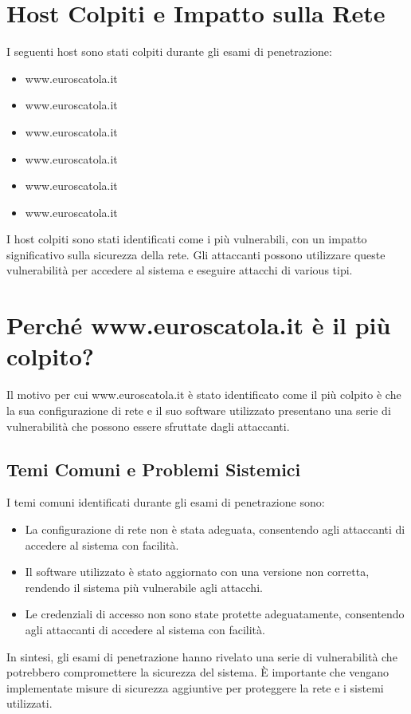 \section{Host Colpiti e Impatto sulla Rete}

I seguenti host sono stati colpiti durante gli esami di penetrazione:
\begin{itemize}
\item www.euroscatola.it
\item www.euroscatola.it
\item www.euroscatola.it
\item www.euroscatola.it
\item www.euroscatola.it
\item www.euroscatola.it
\end{itemize}
I host colpiti sono stati identificati come i più vulnerabili, con un impatto significativo sulla sicurezza della rete. Gli attaccanti possono utilizzare queste vulnerabilità per accedere al sistema e eseguire attacchi di various tipi.

\section{Perché www.euroscatola.it è il più colpito?}

Il motivo per cui www.euroscatola.it è stato identificato come il più colpito è che la sua configurazione di rete e il suo software utilizzato presentano una serie di vulnerabilità che possono essere sfruttate dagli attaccanti.

\subsection{Temi Comuni e Problemi Sistemici}

I temi comuni identificati durante gli esami di penetrazione sono:
\begin{itemize}
\item La configurazione di rete non è stata adeguata, consentendo agli attaccanti di accedere al sistema con facilità.
\item Il software utilizzato è stato aggiornato con una versione non corretta, rendendo il sistema più vulnerabile agli attacchi.
\item Le credenziali di accesso non sono state protette adeguatamente, consentendo agli attaccanti di accedere al sistema con facilità.
\end{itemize}
In sintesi, gli esami di penetrazione hanno rivelato una serie di vulnerabilità che potrebbero compromettere la sicurezza del sistema. È importante che vengano implementate misure di sicurezza aggiuntive per proteggere la rete e i sistemi utilizzati.


